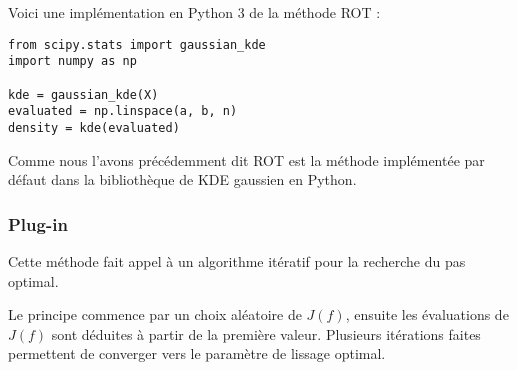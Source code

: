 Voici une implémentation en Python 3 de la méthode ROT : 
\begin{lstlisting}
from scipy.stats import gaussian_kde
import numpy as np

kde = gaussian_kde(X)
evaluated = np.linspace(a, b, n)
density = kde(evaluated)

\end{lstlisting}
Comme nous l'avons précédemment dit ROT est la méthode implémentée par défaut dans la bibliothèque de KDE gaussien en Python.

\subsubsection{Plug-in}
Cette méthode fait appel à un algorithme itératif pour la recherche du pas optimal.

Le principe commence par un choix aléatoire de $J(f)$, ensuite les évaluations de $J(f)$  sont déduites à partir de la première valeur. Plusieurs itérations faites permettent de converger vers le paramètre de lissage optimal.

